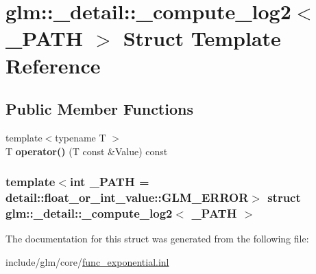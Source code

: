 \hypertarget{structglm_1_1__detail_1_1__compute__log2}{\section{glm\-:\-:\-\_\-detail\-:\-:\-\_\-compute\-\_\-log2$<$ \-\_\-\-P\-A\-T\-H $>$ \-Struct \-Template \-Reference}
\label{structglm_1_1__detail_1_1__compute__log2}
}
\subsection*{\-Public \-Member \-Functions}
\begin{DoxyCompactItemize}
\item 
\hypertarget{structglm_1_1__detail_1_1__compute__log2_aca7f23dcf7f951497006e6b6de4a77a4}{{\footnotesize template$<$typename T $>$ }\\\-T {\bfseries operator()} (\-T const \&\-Value) const }\label{structglm_1_1__detail_1_1__compute__log2_aca7f23dcf7f951497006e6b6de4a77a4}

\end{DoxyCompactItemize}
\subsubsection*{template$<$int \-\_\-\-P\-A\-T\-H = detail\-::float\-\_\-or\-\_\-int\-\_\-value\-::\-G\-L\-M\-\_\-\-E\-R\-R\-O\-R$>$ struct glm\-::\-\_\-detail\-::\-\_\-compute\-\_\-log2$<$ \-\_\-\-P\-A\-T\-H $>$}



\-The documentation for this struct was generated from the following file\-:\begin{DoxyCompactItemize}
\item 
include/glm/core/\hyperlink{func__exponential_8inl}{func\-\_\-exponential.\-inl}\end{DoxyCompactItemize}
